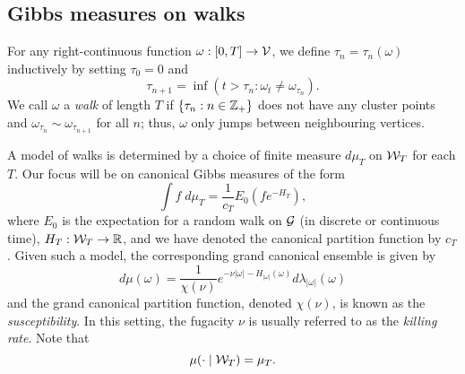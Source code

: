 
\subsection{Gibbs measures on walks}

For any right-continuous function $\omega : [0, T] \rightarrow \mathcal{V}$, we define
$\tau_n = \tau_n(\omega)$ inductively by setting $\tau_0 = 0$ and
\begin{equation}
\tau_{n+1} = \inf(t > \tau_n : \omega_t \ne \omega_{\tau_n}).
\end{equation}
We call $\omega$ a \emph{walk} of length $T$ if
$\{ \tau_n : n \in {\mathbb Z}_+ \}$ does not have any cluster points and
$\omega_{\tau_n} \sim \omega_{\tau_{n+1}}$ for all $n$; thus, $\omega$
only jumps between neighbouring vertices.

A model of walks is determined by a choice of finite measure $d\mu_T$ on
$\mathcal{W}_T$ for each $T$. Our focus will be on canonical Gibbs measures of the form
\begin{equation}
\int f \; d\mu_T = \frac{1}{c_T} E_0 (f e^{-H_T}),
\end{equation}
where $E_0$ is the expectation for a random walk on $\mathcal{G}$ (in discrete or continuous time), $H_T : \mathcal{W}_T \rightarrow {\mathbb R}$, and we have denoted the canonical partition function by $c_T$.
Given such a model, the corresponding grand canonical ensemble is given by
\begin{equation}
d\mu(\omega)
  =
\frac{1}{\chi(\nu)}
e^{-\nu |\omega| - H_{|\omega|}(\omega)}
d\lambda_{|\omega|}(\omega)
\end{equation}
and the grand canonical partition function, denoted $\chi(\nu)$, is known as the \emph{susceptibility}. In this setting, the fugacity $\nu$ is usually referred to as the \emph{killing rate}.
Note that
\begin{equation}
\mu(\cdot \mid \mathcal{W}_T) = \mu_T.
\end{equation}

